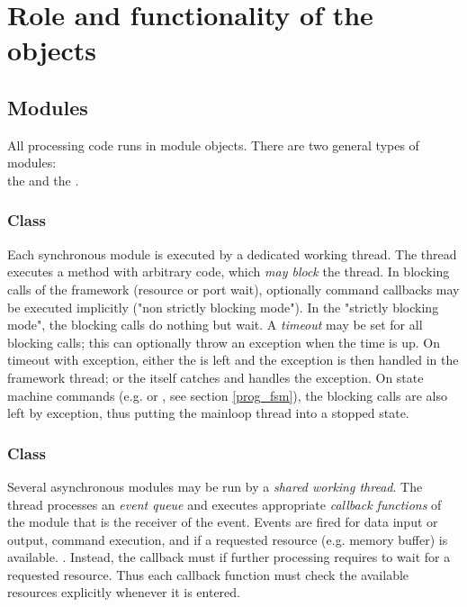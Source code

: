 \section{Role and  functionality of the objects}

\subsection{Modules}
\label{prog_overview_modules}
All processing code runs in module objects. 
There are two general types of modules: \\
the  and the . 

\subsubsection{Class } 
Each synchronous module is executed by a 
dedicated working thread. The thread executes a
 method  with arbitrary code, which {\sl may block} 
the thread. In blocking calls of the framework (resource or 
port wait), optionally command callbacks may be executed 
implicitly ("non strictly blocking mode"). In the "strictly 
blocking mode", the blocking calls do nothing but wait. 
A {\sl timeout} may be set for all blocking calls; this can 
optionally throw an exception when the time is up. On timeout 
with exception, either the  is left and the exception 
is then handled in the framework thread; or the  itself 
catches and handles the exception. On state machine commands (e.g. 
 or , see section \ref{prog_fsm}), 
the blocking calls are also left by exception, 
thus putting the mainloop thread into a stopped state.

\subsubsection{Class }
 Several asynchronous modules may be run by a {\sl shared working thread}. 
The thread processes an  {\sl event queue} and executes 
appropriate  {\sl callback functions} 
of the module that is the receiver of the event. Events are fired for data input 
or output, command execution, and if a requested resource (e.g. memory buffer) 
is available. . 
Instead, the callback must  if further processing requires 
to wait for a requested resource. Thus each callback function must check the 
available resources explicitly whenever it is entered.
           
